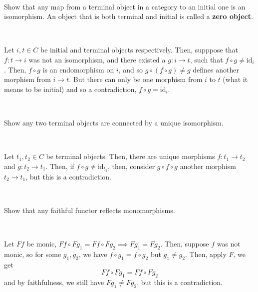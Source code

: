 \documentclass{article}
\begin{document}
\begin{exercise}[1.6.i]
\

Show that any map from a terminal object in a category to an initial one is an isomorphism. An object that is both terminal and initial is called a \textbf{zero object}. 
\end{exercise}

\begin{solution}
\

Let $i, t \in C$ be initial and terminal objects respectively. Then, supppose that $f: t \to i$ was not an isomorphism, and there existed a $g: i \to t$, such that $f \circ g \neq \text{id}_i$. Then, $f \circ g$ is an endomorphism on $i$, and so $g \circ (f \circ g) \neq g$ defines another morphism from $i \to t$. But there can only be one morphism from $i$ to $t$ (what it means to be initial) and so a contradiction, $f \circ g = \text{id}_i$.
\end{solution}

\begin{exercise}[1.6.ii]
\

Show any two terminal objects are connected by a unique isomorphism.
\end{exercise}

\begin{solution}
\

Let $t_1, t_2 \in C$ be terminal objects. Then, there are unique morphisms $f: t_1 \to t_2$ and $g: t_2 \to t_1$. Then, if $f \circ g \neq \text{id}_{t_2}$, then, consider $g \circ f \circ g$ another morphism $t_2 \to t_1$, but this is a contradiction.
\end{solution}

\begin{exercise}[1.6.iii]
\

Show that any faithful functor reflects monomorphisms.
\end{exercise}

\begin{solution}
\

Let $Ff$ be monic, $Ff \circ Fg_1 = Ff \circ Fg_2 \implies Fg_1 = Fg_2$. Then, suppose $f$ was not monic, so for some $g_1, g_2$, we have $f \circ g_1 = f \circ g_2$ but $g_1 \neq g_2$. Then, apply $F$, we get $$Ff \circ Fg_1 = Ff \circ Fg_2$$and by faithfulness, we still have $Fg_1 \neq Fg_2$, but this is a contradiction.
\end{solution}
\end{document}
